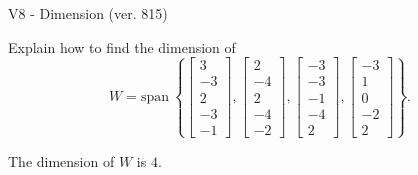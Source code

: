 \begin{exercise}
  \begin{exerciseTitle}V8 - Dimension (ver. 815)\end{exerciseTitle}
  \begin{exerciseStatement}
    Explain how to find the dimension of 
\[W=\mathrm{span}\ \left\{\left[\begin{array}{r}
3 \\
-3 \\
2 \\
-3 \\
-1
\end{array}\right] , \left[\begin{array}{r}
2 \\
-4 \\
2 \\
-4 \\
-2
\end{array}\right] , \left[\begin{array}{r}
-3 \\
-3 \\
-1 \\
-4 \\
2
\end{array}\right] , \left[\begin{array}{r}
-3 \\
1 \\
0 \\
-2 \\
2
\end{array}\right]\right\}.\]



  \end{exerciseStatement}
  \begin{exerciseAnswer}
   The dimension of \(W\) is  \(4\).
  


  \end{exerciseAnswer}
\end{exercise}